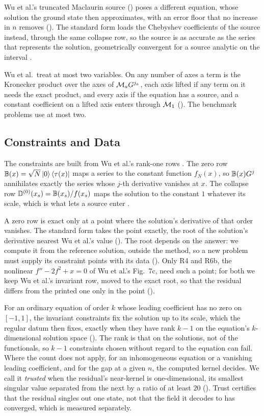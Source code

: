 Wu et al.'s truncated Maclaurin source () poses a different equation, whose solution the ground state then approximates, with an error floor that no increase in $n$ removes (). The standard form loads the Chebyshev coefficients of the source instead, through the same collapse row, so the source is as accurate as the series that represents the solution, geometrically convergent for a source analytic on the interval \cite{trefethen2013approximation}.

Wu et al.\ treat at most two variables. On any number of axes a term is the Kronecker product over the axes of $\mathcal{M}_{a}G^{j_a}$, each axis lifted if any term on it needs the exact product, and every axis if the equation has a source, and a constant coefficient on a lifted axis enters through $\mathcal{M}_1$ (). The benchmark problems use at most two.

\subsection{Constraints and Data}
\label{sec:standard-constraints}

The constraints are built from Wu et al.'s rank-one rows \cite{wu2025pihm}. The zero row $\mathbb{B}(x)=\sqrt{N}\ket{0}\bra{\tau(x)}$ maps a series to the constant function $f_N(x)$, so $\mathbb{B}(x)G^{j}$ annihilates exactly the series whose $j$-th derivative vanishes at $x$. The collapse row $\mathbb{D}^{(0)}(x_s)=\mathbb{B}(x_s)/f(x_s)$ maps the solution to the constant $1$ whatever its scale, which is what lets a source enter .

A zero row is exact only at a point where the solution's derivative of that order vanishes. The standard form takes the point exactly, the root of the solution's derivative nearest Wu et al.'s value (). The root depends on the answer: we compute it from the reference solution, outside the method, so a new problem must supply its constraint points with its data (). Only R4 and R6b, the nonlinear $f''-2f^2+x=0$ of Wu et al.'s Fig.~7c, need such a point; for both we keep Wu et al.'s invariant row, moved to the exact root, so that the residual differs from the printed one only in the point ().

For an ordinary equation of order $k$ whose leading coefficient has no zero on $[-1,1]$, the invariant constraints fix the solution up to its scale, which the regular datum then fixes, exactly when they have rank $k-1$ on the equation's $k$-dimensional solution space (). The rank is that on the solutions, not of the functionals, so $k-1$ constraints chosen without regard to the equation can fail. Where the count does not apply, for an inhomogeneous equation or a vanishing leading coefficient, and for the gap at a given $n$, the computed kernel decides. We call it \emph{trusted} when the residual's near-kernel is one-dimensional, its smallest singular value separated from the next by a ratio of at least $20$ (). Trust certifies that the residual singles out one state, not that the field it decodes to has converged, which is measured separately.

